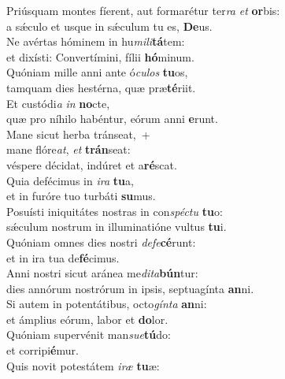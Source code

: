 \evenverse Priúsquam montes fíerent, aut formarétur ter\textit{ra} \textit{et} \textbf{or}bis:~\*\\
\evenverse a sǽculo et usque in sǽculum tu es, \textbf{De}us.\\
\oddverse Ne avértas hóminem in hu\textit{mi}\textit{li}\textbf{tá}tem:~\*\\
\oddverse et dixísti: Convertímini, fílii \textbf{hó}minum.\\
\evenverse Quóniam mille anni ante ó\textit{cu}\textit{los} \textbf{tu}os,~\*\\
\evenverse tamquam dies hestérna, quæ præ\textbf{té}riit.\\
\oddverse Et custódi\textit{a} \textit{in} \textbf{no}cte,~\*\\
\oddverse quæ pro níhilo habéntur, eórum anni \textbf{e}runt.\\
\evenverse Mane sicut herba tránseat,~+\\
\evenverse  mane flóre\textit{at}, \textit{et} \textbf{trán}seat:~\*\\
\evenverse véspere décidat, indúret et a\textbf{ré}scat.\\
\oddverse Quia defécimus in \textit{i}\textit{ra} \textbf{tu}a,~\*\\
\oddverse et in furóre tuo turbáti \textbf{su}mus.\\
\evenverse Posuísti iniquitátes nostras in con\textit{spé}\textit{ctu} \textbf{tu}o:~\*\\
\evenverse sǽculum nostrum in illuminatióne vultus \textbf{tu}i.\\
\oddverse Quóniam omnes dies nostri \textit{de}\textit{fe}\textbf{cé}runt:~\*\\
\oddverse et in ira tua de\textbf{fé}cimus.\\
\evenverse Anni nostri sicut aránea me\textit{di}\textit{ta}\textbf{bún}tur:~\*\\
\evenverse dies annórum nostrórum in ipsis, septuagínta \textbf{an}ni.\\
\oddverse Si autem in potentátibus, octo\textit{gín}\textit{ta} \textbf{an}ni:~\*\\
\oddverse et ámplius eórum, labor et \textbf{do}lor.\\
\evenverse Quóniam supervénit man\textit{su}\textit{e}\textbf{tú}do:~\*\\
\evenverse et corripi\textbf{é}mur.\\
\oddverse Quis novit potestátem \textit{i}\textit{ræ} \textbf{tu}æ:~\*\\
